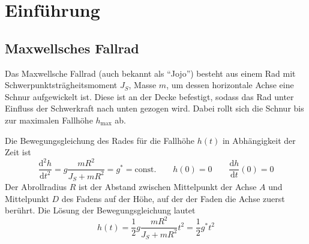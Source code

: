 \section{Einführung}
\subsection{Maxwellsches Fallrad}
Das Maxwellsche Fallrad (auch bekannt als ``Jojo'') besteht aus einem Rad mit Schwerpunktsträgheitsmoment $J_S$, Masse $m$, um dessen horizontale Achse eine Schnur aufgewickelt ist. Diese ist an der Decke befestigt, sodass das Rad unter Einfluss der Schwerkraft nach unten gezogen wird. Dabei rollt sich die Schnur bis zur maximalen Fallhöhe $h_{\text{max}}$ ab.

Die Bewegungsgleichung des Rades für die Fallhöhe $h(t)$ in Abhängigkeit der Zeit ist
\begin{equation}
  \frac{\mathrm{d}^2h}{\mathrm{d}t^2}=g \frac{mR^2}{J_S+mR^2}=g^*=\text{const.}\qquad h(0)=0 \qquad \frac{\mathrm{d}h}{\mathrm{d}t}(0)=0
  \label{eq:bwgl}
\end{equation}
Der Abrollradius $R$ ist der Abstand zwischen Mittelpunkt der Achse $A$ und Mittelpunkt $D$ des Fadens auf der Höhe, auf der der Faden die Achse zuerst berührt.
Die Lösung der Bewegungsgleichung lautet
\begin{equation}
  h(t)=\frac{1}{2}g \frac{mR^2}{J_S +mR^2}t^2=\frac{1}{2}g^* t^2
  \label{eq:fallhoehe}
\end{equation}

